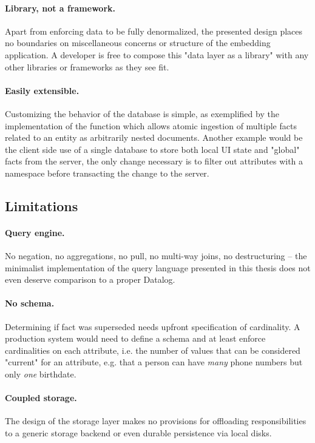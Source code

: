 \paragraph{Library, not a framework.} Apart from enforcing data to be fully denormalized, the presented design places no boundaries on miscellaneous concerns or structure of the embedding application. A developer is free to compose this "data layer as a library" with any other libraries or frameworks as they see fit.

\paragraph{Easily extensible.} Customizing the behavior of the database is simple, as exemplified by the implementation of the  function which allows atomic ingestion of multiple facts related to an entity as arbitrarily nested documents. Another example would be the client side use of a single database to store both local \gls{UI} state and "global" facts from the server, the only change necessary is to filter out attributes with a  namespace before transacting the change to the server.



\subsection{Limitations}

\paragraph{Query engine.} No negation, no aggregations, no pull, no multi-way joins, no destructuring -- the minimalist implementation of the query language presented in this thesis does not even deserve comparison to a proper Datalog.

\paragraph{No schema.} Determining if fact was superseded needs upfront specification of cardinality. A production system would need to define a schema and at least enforce cardinalities on each attribute, i.e. the number of values that can be considered "current" for an attribute, e.g. that a person can have \emph{many} phone numbers but only \emph{one} birthdate.

\paragraph{Coupled storage.} The design of the storage layer makes no provisions for offloading responsibilities to a generic storage backend or even durable persistence via local disks.

